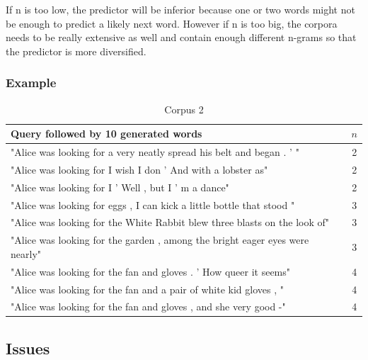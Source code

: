 \documentclass[a4paper,12pt]{article}
\begin{document}
If n is too low, the predictor will be inferior because one or two words might not be enough to predict a likely next word. However if n is too big, the corpora needs to be really extensive as well and contain enough different n-grams so that the predictor is more diversified.

\subsubsection{Example}

\begin{table}[!h]
\small
\begin{tabular}{| l |c|}
\hline
Query followed by 10 generated words & $n$ \\ \hline
"Alice was looking for a very neatly spread his belt and began . ' " & 2\\ \hline
"Alice was looking for I wish I don ' And with a lobster as" & 2\\ \hline
"Alice was looking for I ' Well , but I ' m a dance" & 2\\ \hline
"Alice was looking for eggs , I can kick a little bottle that stood "& 3 \\ \hline
"Alice was looking for the White Rabbit blew three blasts on the look of"& 3 \\ \hline
"Alice was looking for the garden , among the bright eager eyes were nearly"& 3 \\ \hline
"Alice was looking for the fan and gloves . ' How queer it seems" & 4 \\ \hline
"Alice was looking for the fan and a pair of white kid gloves , " & 4 \\ \hline
"Alice was looking for the fan and gloves , and she very good -" & 4 \\ \hline
\end{tabular}
\caption{Corpus 2}
\label{tab:corpus2}
\end{table}


\subsection{Issues}

\end{document}
